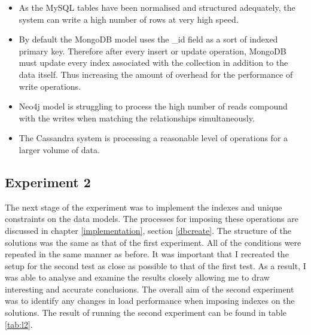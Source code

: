 \begin{itemize}
\item As the MySQL tables have been normalised and structured adequately, the system can write a high number of rows at very high speed.
\item By default the MongoDB model uses the \_id field as a sort of indexed primary key. Therefore after every insert or update operation, MongoDB must update every index associated with the collection in addition to the data itself. Thus increasing the amount of overhead for the performance of write operations.
\item Neo4j model is struggling to process the high number of reads compound with the writes when matching the relationships simultaneously.
\item The Cassandra system is processing a reasonable level of operations for a larger volume of data.
\end{itemize}

\subsection{Experiment 2}\label{experiment2}
The next stage of the experiment was to implement the indexes and unique constraints on the data models. The processes for imposing these operations are discussed in chapter \ref{implementation}, section \ref{dbcreate}. The structure of the solutions was the same as that of the first experiment. All of the conditions were repeated in the same manner as before. It was important that I recreated the setup for the second test as close as possible to that of the first test. As a result, I was able to analyse and examine the results closely allowing me to draw interesting and accurate conclusions. The overall aim of the second experiment was to identify any changes in load performance when imposing indexes on the solutions. The result of running the second experiment can be found in table \ref{tab:l2}.

